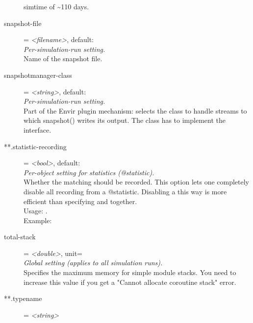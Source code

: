 \begin{description}
    simtime of {\textasciitilde}110 days.
\item[snapshot-file] = \textit{<filename>}, default: \\
    \textit{Per-simulation-run setting.}\\
    Name of the snapshot file.
\item[snapshotmanager-class] = \textit{<string>}, default: \\
    \textit{Per-simulation-run setting.}\\
    Part of the Envir plugin mechanism: selects the class to handle streams to
    which snapshot() writes its output. The class has to implement the
     interface.
\item[**.statistic-recording] = \textit{<bool>}, default: \\
    \textit{Per-object setting for statistics (@statistic).}\\
    Whether the matching  should be recorded. This
    option lets one completely disable all recording from a @statistic.
    Disabling a  this way is more efficient than
    specifying
     and
    together.\\
    Usage:
    .\\
    Example:
\item[total-stack] = \textit{<double>}, unit=\\
    \textit{Global setting (applies to all simulation runs).}\\
    Specifies the maximum memory for  simple module stacks. You
    need to increase this value if you get a "Cannot allocate coroutine stack"
    error.
\item[**.typename] = \textit{<string>}\\

\end{description}
